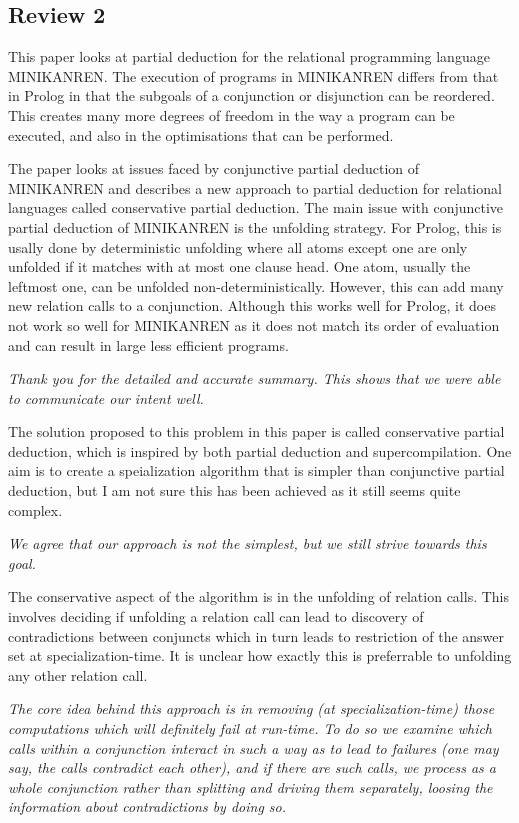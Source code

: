 \subsection*{Review 2}

This paper looks at partial deduction for the relational programming language  MINIKANREN. The execution of programs in MINIKANREN differs from that in Prolog in that the subgoals of a conjunction or disjunction can be reordered. This creates many more degrees of freedom in the way a program can be executed, and also in the optimisations that can be performed.

The paper looks at issues faced by conjunctive partial deduction of MINIKANREN and describes a new approach to partial deduction for relational languages called conservative partial deduction. The main issue with conjunctive partial deduction of MINIKANREN is the unfolding strategy. For Prolog, this is usally done by deterministic unfolding where all atoms except one are only unfolded if it matches with at most one clause head. One atom, usually the leftmost one, can be unfolded non-deterministically. However, this can add many new relation calls to a conjunction. Although this works well for Prolog, it does not work so well for MINIKANREN as it does not match its order of evaluation and can result in large less efficient programs.

\emph{Thank you for the detailed and accurate summary. This shows that we were able to communicate our intent well.}

The solution proposed to this problem in this paper is called conservative partial deduction, which is inspired by both partial deduction and supercompilation. One aim is to create a speialization algorithm that is simpler than conjunctive partial deduction, but I am not sure this has been achieved as it still seems quite complex.

\emph{We agree that our approach is not the simplest, but we still strive towards this goal.}

The conservative aspect of the algorithm is in the unfolding of relation calls. This involves deciding if unfolding a relation call can lead to discovery of contradictions between conjuncts which in turn leads to restriction of the answer set at specialization-time. It is unclear how exactly this is preferrable to unfolding any other relation call.

\emph{The core idea behind this approach is in removing (at specialization-time) those computations which will definitely fail at run-time. To do so we examine which calls within a conjunction interact in such a way as to lead to failures (one may say, the calls contradict each other), and if there are such calls, we process as a whole conjunction rather than splitting and driving them separately, loosing the information about contradictions by doing so.}

